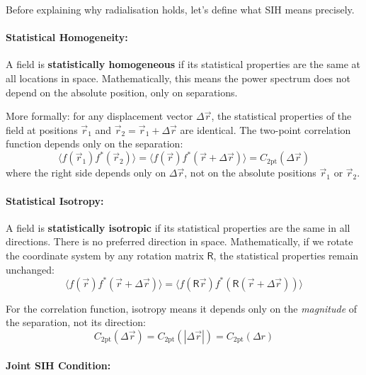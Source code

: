 Before explaining why radialisation holds, let's define what SIH means precisely.

\paragraph{Statistical Homogeneity:}

A field is \textbf{statistically homogeneous} if its statistical properties are the same at all locations in space. Mathematically, this means the power spectrum does not depend on the absolute position, only on separations.

More formally: for any displacement vector $\Delta \vec{r}$, the statistical properties of the field at positions $\vec{r}_1$ and $\vec{r}_2 = \vec{r}_1 + \Delta \vec{r}$ are identical. The two-point correlation function depends only on the separation:
\begin{equation}
\langle f(\vec{r}_1) f^*(\vec{r}_2) \rangle = \langle f(\vec{r}) f^*(\vec{r} + \Delta \vec{r}) \rangle = C_{\text{2pt}}(\Delta \vec{r})
\end{equation}
where the right side depends only on $\Delta \vec{r}$, not on the absolute positions $\vec{r}_1$ or $\vec{r}_2$.

\paragraph{Statistical Isotropy:}

A field is \textbf{statistically isotropic} if its statistical properties are the same in all directions. There is no preferred direction in space. Mathematically, if we rotate the coordinate system by any rotation matrix $\mathsf{R}$, the statistical properties remain unchanged:
\begin{equation}
\langle f(\vec{r}) f^*(\vec{r} + \Delta \vec{r}) \rangle = \langle f(\mathsf{R}\vec{r}) f^*(\mathsf{R}(\vec{r} + \Delta \vec{r})) \rangle
\end{equation}

For the correlation function, isotropy means it depends only on the \emph{magnitude} of the separation, not its direction:
\begin{equation}
C_{\text{2pt}}(\Delta \vec{r}) = C_{\text{2pt}}(|\Delta \vec{r}|) = C_{\text{2pt}}(\Delta r)
\end{equation}

\paragraph{Joint SIH Condition:}

